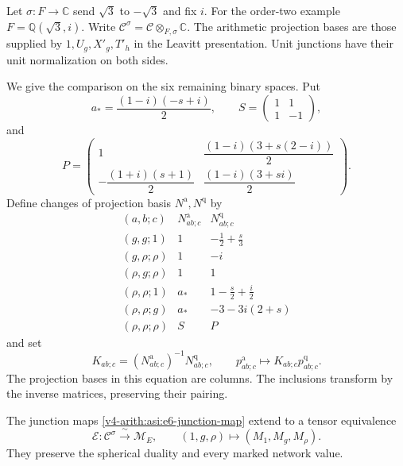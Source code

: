 Let $\sigma:F\to\mathbb C$ send $\sqrt3$ to $-\sqrt3$ and fix $i$.
For the order-two example $F=\mathbb Q(\sqrt3,i)$. Write
$\mathcal C^\sigma=\mathcal C\otimes_{F,\sigma}\mathbb C$.
The arithmetic projection bases are those supplied by
$1,U_g,X'_g,T'_h$ in the Leavitt presentation. Unit junctions have
their unit normalization on both sides.

We give the comparison on the six remaining binary spaces. Put
\[
 a_* =\frac{(1-i)(-s+i)}2,\qquad
 S=\begin{pmatrix}1&1\\1&-1\end{pmatrix},
\]
and
\[
 P=\begin{pmatrix}
 1&\dfrac{(1-i)(3+s(2-i))}{2}\\[3pt]
 -\dfrac{(1+i)(s+1)}2&\dfrac{(1-i)(3+si)}2
 \end{pmatrix}.
\]
Define changes of projection basis $N^{\mathrm a},N^{\mathrm q}$ by
\[
\begin{array}{c|c|c}
 (a,b;c)&N^{\mathrm a}_{ab;c}&N^{\mathrm q}_{ab;c}\\ \hline
 (g,g;1)&1&-\frac12+\frac{s}{3}\\
 (g,\rho;\rho)&1&-i\\
 (\rho,g;\rho)&1&1\\
 (\rho,\rho;1)&a_*&1-\frac{s}{2}+\frac i2\\
 (\rho,\rho;g)&a_*&-3-3i(2+s)\\
 (\rho,\rho;\rho)&S&P
\end{array}
\]
and set
\begin{equation}\label{v4-arith:asi:e6-junction-map}
 K_{ab;c}=(N^{\mathrm a}_{ab;c})^{-1}N^{\mathrm q}_{ab;c},
 \qquad p^{\mathrm a}_{ab;c}\longmapsto K_{ab;c}p^{\mathrm q}_{ab;c}.
\end{equation}
The projection bases in this equation are columns. The inclusions
transform by the inverse matrices, preserving their pairing.

\begin{theorem}\label{v4-arith:asi:e6-tensor-equivalence}
The junction maps \eqref{v4-arith:asi:e6-junction-map} extend to a tensor
equivalence
\[
 \mathcal E:\mathcal C^\sigma\xrightarrow{\ \sim\ }\mathcal M_E,
 \qquad (1,g,\rho)\longmapsto(M_1,M_g,M_\rho).
\]
They preserve the spherical duality and every marked network value.
\end{theorem}

